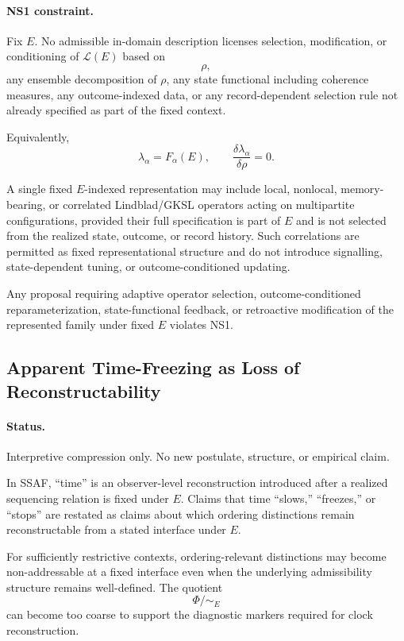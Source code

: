 \documentclass[aps,prx,onecolumn,11pt]{revtex4-2}
\theoremstyle{plain}
\theoremstyle{definition}
\theoremstyle{remark}
\begin{document}
\paragraph{NS1 constraint.}

Fix \(E\). No admissible in-domain description licenses selection,
modification, or conditioning of \(\mathcal L(E)\) based on
\[
\rho,
\]
any ensemble decomposition of \(\rho\), any state functional including
coherence measures, any outcome-indexed data, or any record-dependent
selection rule not already specified as part of the fixed context.

Equivalently,
\[
\lambda_\alpha=F_\alpha(E),
\qquad
\frac{\delta\lambda_\alpha}{\delta\rho}=0.
\]

A single fixed \(E\)-indexed representation may include local,
nonlocal, memory-bearing, or correlated Lindblad/GKSL operators acting
on multipartite configurations, provided their full specification is
part of \(E\) and is not selected from the realized state, outcome, or
record history. Such correlations are permitted as fixed
representational structure and do not introduce signalling,
state-dependent tuning, or outcome-conditioned updating.

Any proposal requiring adaptive operator selection,
outcome-conditioned reparameterization, state-functional feedback, or
retroactive modification of the represented family under fixed \(E\)
violates NS1.

\subsection{Apparent Time-Freezing as Loss of Reconstructability}
\label{subsubsec:time_freezing_nonaddressability}

\paragraph{Status.}

Interpretive compression only. No new postulate, structure, or
empirical claim.

In SSAF, ``time'' is an observer-level reconstruction introduced after
a realized sequencing relation is fixed under \(E\). Claims that time
``slows,'' ``freezes,'' or ``stops'' are restated as claims about which
ordering distinctions remain reconstructable from a stated interface
under \(E\).

For sufficiently restrictive contexts, ordering-relevant distinctions
may become non-addressable at a fixed interface even when the
underlying admissibility structure remains well-defined. The quotient
\[
\Phi/{\sim_E}
\]
can become too coarse to support the diagnostic markers required for
clock reconstruction.
\end{document}
